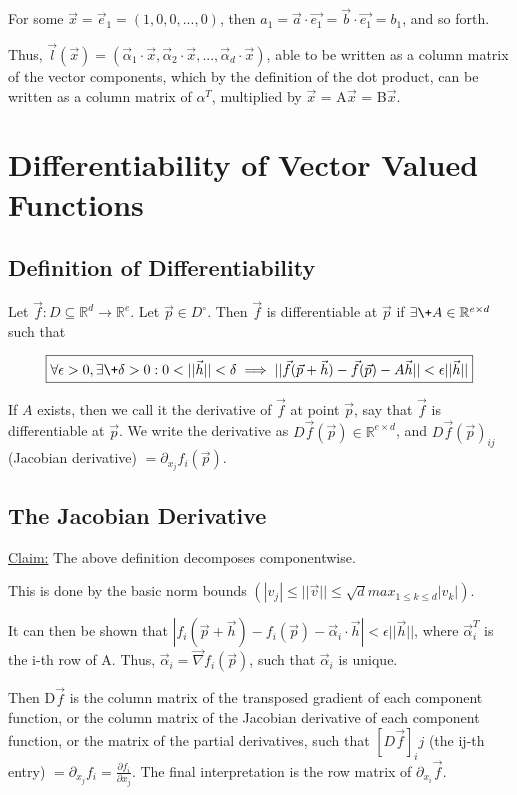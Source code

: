 \documentclass[11 pt, twoside]{article}
\begin{document}
For some $\vec{x} = \vec{e}_1 = (1, 0, 0, ..., 0)$, then $a_1 = \vec{a} \cdot \vec{e_1} = \vec{b} \cdot \vec{e_1} = b_1$, and so forth.

Thus, $\vec{l}(\vec{x}) = (\vec{\alpha}_1 \cdot \vec{x}, \vec{\alpha}_2 \cdot \vec{x}, ..., \vec{\alpha}_d \cdot \vec{x})$, able to be written as a column matrix of the vector components, which by the definition of the dot product, can be written as a column matrix of $\alpha^T$, multiplied by $\vec{x}$ = A$\vec{x}$ = B$\vec{x}$.

\section{Differentiability of Vector Valued Functions}
\subsection{Definition of Differentiability}
Let $\vec{f} : D \subseteq \mathbb{R}^d \to \mathbb{R}^e$. Let $\vec{p}
\in D^\circ$. Then $\vec{f}$ is differentiable at $\vec{p}$ if $\exists \+A \in
\mathbb{R}^{e \times d}$ such that

$$\boxed{\forall \epsilon > 0, \exists \+ \delta > 0: 0 < ||\vec{h}|| < \delta
\implies ||\vec{f}(\vec{p} + \vec{h}) - \vec{f}(\vec{p}) - A
\vec{h}|| < \epsilon ||\vec{h}||}$$

If $A$ exists, then we call it the derivative of $\vec{f}$ at point $\vec{p}$, say that $\vec{f}$ is differentiable at $\vec{p}$. We write the derivative as $D\vec{f}(\vec{p}) \in \mathbb{R}^{e \times d}$, and $D\vec{f}(\vec{p})_{ij}$ (Jacobian derivative) $= \partial_{x_j} f_i (\vec{p})$.

\subsection{The Jacobian Derivative}

\underline{Claim:} The above definition decomposes componentwise.

This is done by the basic norm bounds $(|v_j| \leq ||\vec{v}|| \leq \sqrt{d}max_{1 \leq k \leq d} |v_k|)$.

It can then be shown that $|f_i(\vec{p} + \vec{h}) - f_i(\vec{p}) - \vec{\alpha}_i \cdot \vec{h}| < \epsilon||\vec{h}||$, where $\vec{\alpha}_i^T$ is the i-th row of A. Thus, $\vec{\alpha}_i = \vec{\nabla}f_i(\vec{p})$, such that $\vec{\alpha}_i$ is unique.

Then D$\vec{f}$ is the column matrix of the transposed gradient of each component function, or the column matrix of the Jacobian derivative of each component function, or the matrix of the partial derivatives, such that $[D\vec{f}]_ij$ (the ij-th entry) $= \partial_{x_j}f_i = \frac{\partial f_i}{\partial x_j}$. The final interpretation is the row matrix of $\partial_{x_i}\vec{f}$.
\end{document}
